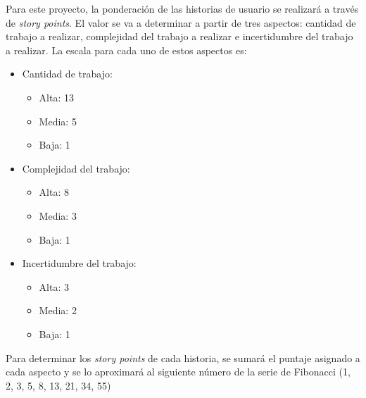 \documentclass[
11pt, %
]{charter}
\begin{document}

Para este proyecto, la ponderación de las historias de usuario se realizará a través de \textit{story points}. El valor se va a determinar a partir de tres aspectos: cantidad de trabajo a realizar, complejidad del trabajo a realizar e incertidumbre del trabajo a realizar. La escala para cada uno de estos aspectos es:

\begin{itemize}
	\item Cantidad de trabajo:
	\begin{itemize}
		\item Alta: 13
		\item Media: 5
		\item Baja: 1
	\end{itemize}
	
	\item Complejidad del trabajo:
	\begin{itemize}
		\item Alta: 8
		\item Media: 3
		\item Baja: 1
	\end{itemize}
	
	\item Incertidumbre del trabajo:
	\begin{itemize}
		\item Alta: 3
		\item Media: 2
		\item Baja: 1
	\end{itemize}
\end{itemize}

Para determinar los \textit{story points} de cada historia, se sumará el puntaje asignado a cada aspecto y se lo aproximará al siguiente número de la serie de Fibonacci (1, 2, 3, 5, 8, 13, 21, 34, 55)
\end{document}
